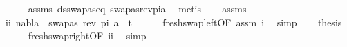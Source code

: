 \begin{isabellebody}
\ \ \ \ \isamarkupfalse%
\ assms\ ds{\isacharunderscore}{\kern0pt}swapas{\isacharunderscore}{\kern0pt}eq\ swapas{\isacharunderscore}{\kern0pt}rev{\isacharunderscore}{\kern0pt}pi{\isacharunderscore}{\kern0pt}a\ \isamarkupfalse%
\ metis\isanewline
\ \ \isamarkupfalse%
\ assms\ \isamarkupfalse%
\ ii{\isacharcolon}{\kern0pt}\ {\isachardoublequoteopen}nabla\ {\isasymturnstile}\ swapas\ {\isacharparenleft}{\kern0pt}rev\ pi{}{\isacharparenright}{\kern0pt}\ a\ {\isasymsharp}\ t{\isachardoublequoteclose}\isanewline
\ \ \ \ \isamarkupfalse%
\ fresh{\isacharunderscore}{\kern0pt}swap{\isacharunderscore}{\kern0pt}left{\isacharbrackleft}{\kern0pt}OF\ assm{}{\isacharbrackright}{\kern0pt}\ i\ \isamarkupfalse%
\ simp\isanewline
\ \ \isamarkupfalse%
\ {\isacharquery}{\kern0pt}thesis\ \isanewline
\ \ \ \ \isamarkupfalse%
\ fresh{\isacharunderscore}{\kern0pt}swap{\isacharunderscore}{\kern0pt}right{\isacharbrackleft}{\kern0pt}OF\ ii{\isacharbrackright}{\kern0pt}\ \isamarkupfalse%
\ simp\isanewline
{}\isamarkupfalse%
%
\endisatagproof
{\isafoldproof}%
%
\isadelimproof
\isanewline
%
\endisadelimproof
%
\isadelimtheory
\isanewline
%
\endisadelimtheory
%
\isatagtheory
{}\isamarkupfalse%
%
\endisatagtheory
{\isafoldtheory}%
%
\isadelimtheory
%
\endisadelimtheory
%
\end{isabellebody}%
\endinput
